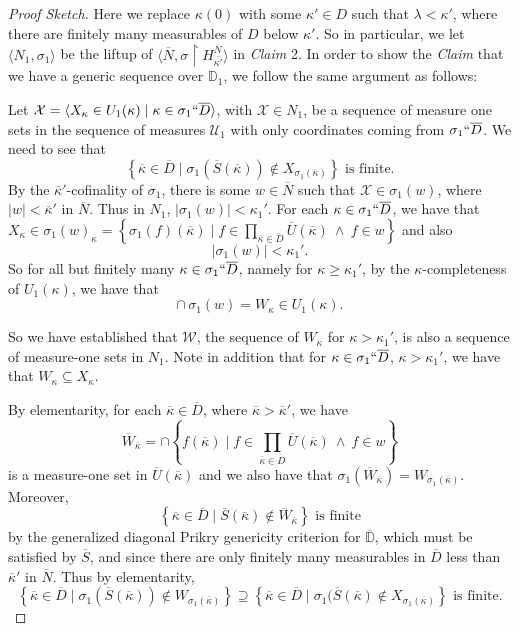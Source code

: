 \documentclass{amsart}
\theoremstyle{definition}
\theoremstyle{remark}
\newcommand{\D}{\mathbb{D}}
\newcommand{\N}{{\overline{N}}}
\renewcommand{\S}{{\overline{S}}}
\newcommand{\U}{\mathcal{U}}
\newcommand{\st}{\; | \;}
\newcommand{\set}[2]{\left\{#1\st #2 \right\}}
\newcommand{\seq}[2]{\langle #1 \st #2 \rangle}
\newcommand{\rest}{\mathbin{\upharpoonright}}
\begin{document}
\begin{proof}[Proof Sketch]
Here we replace $\kappa(0)$ with some $\kappa' \in D$ such that $\lambda < \kappa' $, where there are finitely many measurables of $D$ below $\kappa'$. So in particular, we let $\langle N_1, \sigma_1 \rangle$ be the liftup of $\langle \N, \sigma \rest H_{\overline{\kappa'}}^\N\rangle$ in \textit{Claim} 2. In order to show the \textit{Claim} that we have a generic sequence over $\D_1$, we follow the same argument as follows:

Let $\mathcal X = \seq{ X_\kappa \in U_1(\kappa) }{ \kappa \in \sigma_1``\overline D }$, with $\mathcal X \in N_1$, be a sequence of measure one sets in the sequence of measures $\U_1$ with only coordinates coming from $\sigma_1``\overline D$.
We need to see that 
$$\set{ \overline \kappa \in \overline D}{\sigma_1(\S(\overline \kappa)) \notin X_{\sigma_1(\overline \kappa)} }  \text{ is finite.}$$
By the $\overline{\kappa}'$-cofinality of $\sigma_1$, there is some $w \in \N$ such that $\mathcal X \in \sigma_1(w)$, where $|w| < \overline{\kappa}'$ in $\N$. Thus in $N_1$, $|\sigma_1(w)| < \kappa_1'$. For each $\kappa \in \sigma_1``\overline D$, we have that $X_\kappa \in \sigma_1(w)_\kappa = \set{\sigma_1(f)(\overline \kappa) }{ f \in \prod_{\overline \kappa \in \overline D} \overline U(\overline \kappa) \ \land \ f \in w }$ and also $$|\sigma_1(w)|<\kappa_1'.$$ So for all but finitely many $\kappa \in \sigma_1``\overline D$, namely for $\kappa \geq \kappa_1'$, by the $\kappa$-completeness of $U_1(\kappa)$, we have that $$\cap \, \sigma_1(w)=W_\kappa \in U_1(\kappa).$$

So we have established that $\mathcal W$, the sequence of $W_\kappa$ for $\kappa>\kappa_1'$, is also a sequence of measure-one sets in $N_1$. Note in addition that for $\kappa \in \sigma_1``\overline D$, $\kappa> \kappa_1'$, we have that $W_\kappa \subseteq X_\kappa$. 

By elementarity, for each $\overline \kappa \in \overline D$, where $\overline \kappa > \overline \kappa'$, we have $$\overline W_{\overline \kappa} =\cap \set{f(\overline \kappa) }{ f \in \textstyle\prod_{\overline \kappa \in \overline D} \overline U(\overline \kappa) \ \land \ f \in w }$$ is a measure-one set in $\overline U(\overline \kappa)$ and we also have that $\sigma_1(\overline W_{\overline \kappa}) = W_{\sigma_1(\overline \kappa)}$. Moreover, 
	$$\set{\overline \kappa \in \overline D}{\overline S(\overline \kappa) \notin \overline W_{\overline \kappa}} \text{ is finite}$$ by the generalized diagonal Prikry genericity criterion for $\overline{\D}$, which must be satisfied by $\overline S$, and since there are only finitely many measurables in $\overline D$ less than $\overline \kappa'$ in $\N$.
Thus by elementarity,
	$$\set{ \overline \kappa \in \overline D }{ \sigma_1(\overline S(\overline \kappa)) \notin W_{\sigma_1(\overline \kappa)} } \supseteq \set{ \overline \kappa \in \overline D }{ \sigma_1(\overline S(\overline \kappa) \notin X_{\sigma_1(\overline \kappa)}} \text{ is finite.}$$


\end{proof}
\end{document}
